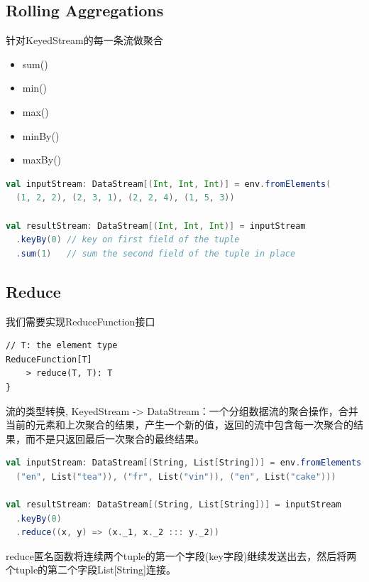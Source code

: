 \documentclass[oneside]{ctexbook}
\begin{document}
\subsection{Rolling Aggregations}

针对KeyedStream的每一条流做聚合

\begin{itemize}
	\item sum()
	\item min()
	\item max()
	\item minBy()
	\item maxBy()
\end{itemize}

\begin{lstlisting}[language=scala, breaklines]
val inputStream: DataStream[(Int, Int, Int)] = env.fromElements(
  (1, 2, 2), (2, 3, 1), (2, 2, 4), (1, 5, 3))

val resultStream: DataStream[(Int, Int, Int)] = inputStream
  .keyBy(0) // key on first field of the tuple
  .sum(1)   // sum the second field of the tuple in place
\end{lstlisting}

\subsection{Reduce}

我们需要实现\colorbox{gray!20}{ReduceFunction}接口

\begin{lstlisting}
// T: the element type
ReduceFunction[T]
    > reduce(T, T): T
}
\end{lstlisting}

流的类型转换, KeyedStream -> DataStream：一个分组数据流的聚合操作，合并当前的元素和上次聚合的结果，产生一个新的值，返回的流中包含每一次聚合的结果，而不是只返回最后一次聚合的最终结果。

\begin{lstlisting}[language=scala, breaklines]
val inputStream: DataStream[(String, List[String])] = env.fromElements(
  ("en", List("tea")), ("fr", List("vin")), ("en", List("cake")))

val resultStream: DataStream[(String, List[String])] = inputStream
  .keyBy(0)
  .reduce((x, y) => (x._1, x._2 ::: y._2))
\end{lstlisting}

reduce匿名函数将连续两个tuple的第一个字段(key字段)继续发送出去，然后将两个tuple的第二个字段List[String]连接。
\end{document}
